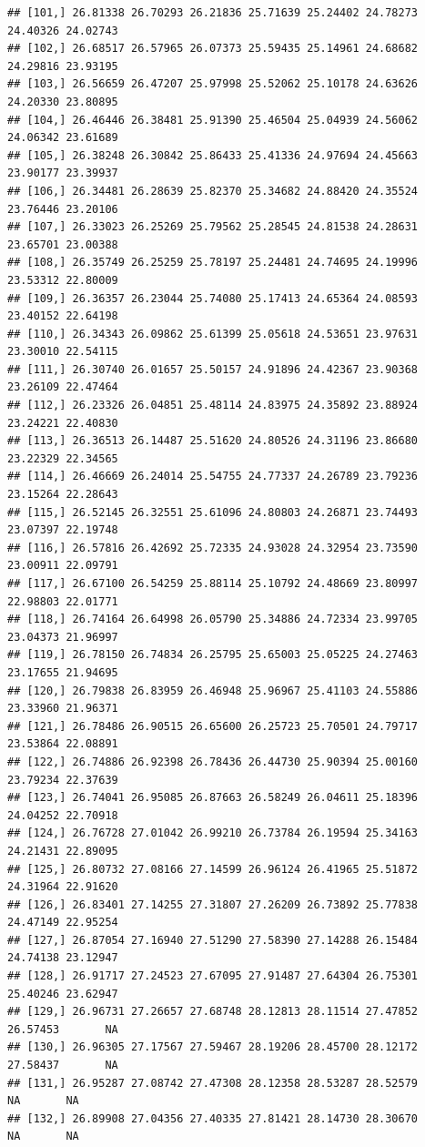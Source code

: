 \documentclass{article}\usepackage[]{graphicx}\usepackage[]{color}
\makeatletter
\newenvironment{kframe}{%
 \def\at@end@of@kframe{}%
 \ifinner\ifhmode%
  \def\at@end@of@kframe{\end{minipage}}%
  \begin{minipage}{\columnwidth}%
 \fi\fi%
 \def\FrameCommand##1{\hskip\@totalleftmargin \hskip-\fboxsep
 \colorbox{shadecolor}{##1}\hskip-\fboxsep
     \hskip-\linewidth \hskip-\@totalleftmargin \hskip\columnwidth}%
 \MakeFramed {\advance\hsize-\width
   \@totalleftmargin\z@ \linewidth\hsize
   \@setminipage}}%
 {\par\unskip\endMakeFramed%
 \at@end@of@kframe}
\newenvironment{knitrout}{}{} %
\makeatother
\begin{document}
\begin{knitrout}
\begin{kframe}
\begin{verbatim}
## [101,] 26.81338 26.70293 26.21836 25.71639 25.24402 24.78273 24.40326 24.02743
## [102,] 26.68517 26.57965 26.07373 25.59435 25.14961 24.68682 24.29816 23.93195
## [103,] 26.56659 26.47207 25.97998 25.52062 25.10178 24.63626 24.20330 23.80895
## [104,] 26.46446 26.38481 25.91390 25.46504 25.04939 24.56062 24.06342 23.61689
## [105,] 26.38248 26.30842 25.86433 25.41336 24.97694 24.45663 23.90177 23.39937
## [106,] 26.34481 26.28639 25.82370 25.34682 24.88420 24.35524 23.76446 23.20106
## [107,] 26.33023 26.25269 25.79562 25.28545 24.81538 24.28631 23.65701 23.00388
## [108,] 26.35749 26.25259 25.78197 25.24481 24.74695 24.19996 23.53312 22.80009
## [109,] 26.36357 26.23044 25.74080 25.17413 24.65364 24.08593 23.40152 22.64198
## [110,] 26.34343 26.09862 25.61399 25.05618 24.53651 23.97631 23.30010 22.54115
## [111,] 26.30740 26.01657 25.50157 24.91896 24.42367 23.90368 23.26109 22.47464
## [112,] 26.23326 26.04851 25.48114 24.83975 24.35892 23.88924 23.24221 22.40830
## [113,] 26.36513 26.14487 25.51620 24.80526 24.31196 23.86680 23.22329 22.34565
## [114,] 26.46669 26.24014 25.54755 24.77337 24.26789 23.79236 23.15264 22.28643
## [115,] 26.52145 26.32551 25.61096 24.80803 24.26871 23.74493 23.07397 22.19748
## [116,] 26.57816 26.42692 25.72335 24.93028 24.32954 23.73590 23.00911 22.09791
## [117,] 26.67100 26.54259 25.88114 25.10792 24.48669 23.80997 22.98803 22.01771
## [118,] 26.74164 26.64998 26.05790 25.34886 24.72334 23.99705 23.04373 21.96997
## [119,] 26.78150 26.74834 26.25795 25.65003 25.05225 24.27463 23.17655 21.94695
## [120,] 26.79838 26.83959 26.46948 25.96967 25.41103 24.55886 23.33960 21.96371
## [121,] 26.78486 26.90515 26.65600 26.25723 25.70501 24.79717 23.53864 22.08891
## [122,] 26.74886 26.92398 26.78436 26.44730 25.90394 25.00160 23.79234 22.37639
## [123,] 26.74041 26.95085 26.87663 26.58249 26.04611 25.18396 24.04252 22.70918
## [124,] 26.76728 27.01042 26.99210 26.73784 26.19594 25.34163 24.21431 22.89095
## [125,] 26.80732 27.08166 27.14599 26.96124 26.41965 25.51872 24.31964 22.91620
## [126,] 26.83401 27.14255 27.31807 27.26209 26.73892 25.77838 24.47149 22.95254
## [127,] 26.87054 27.16940 27.51290 27.58390 27.14288 26.15484 24.74138 23.12947
## [128,] 26.91717 27.24523 27.67095 27.91487 27.64304 26.75301 25.40246 23.62947
## [129,] 26.96731 27.26657 27.68748 28.12813 28.11514 27.47852 26.57453       NA
## [130,] 26.96305 27.17567 27.59467 28.19206 28.45700 28.12172 27.58437       NA
## [131,] 26.95287 27.08742 27.47308 28.12358 28.53287 28.52579       NA       NA
## [132,] 26.89908 27.04356 27.40335 27.81421 28.14730 28.30670       NA       NA

\end{verbatim}
\end{kframe}
\end{knitrout}
\end{document}
